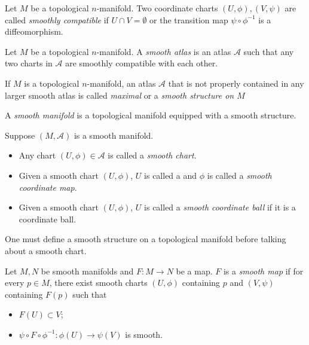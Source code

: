 \begin{defn}
  Let $M$ be a topological $n$-manifold.
  Two coordinate charts $(U, \phi), (V, \psi)$ are called \textit{smoothly compatible} if $U \cap V = \emptyset$ or the transition map $\psi \circ \phi^{-1}$ is a diffeomorphism.
\end{defn}

\begin{defn}
  Let $M$ be a topological $n$-manifold.
  A \textit{smooth atlas} is an atlas $\mathcal{A}$ such that any two charts in $\mathcal{A}$ are smoothly compatible with each other.
\end{defn}

\begin{defn}
  If $M$ is a topological $n$-manifold, an atlas $\mathcal{A}$ that is not properly contained in any larger smooth atlas is called \textit{maximal} or a \textit{smooth structure on $M$}
\end{defn}

\begin{defn}
  A \textit{smooth manifold} is a topological manifold equipped with a smooth structure.
\end{defn}

\begin{defn}
  Suppose $(M, \mathcal{A})$ is a smooth manifold.
  \begin{itemize}
    \item
      Any chart $(U, \phi) \in \mathcal{A}$ is called a \textit{smooth chart}.
    \item
      Given a smooth chart $(U, \phi)$, $U$ is called a  and $\phi$ is called a \textit{smooth coordinate map}.
    \item
      Given a smooth chart $(U, \phi)$, $U$ is called a \textit{smooth coordinate ball} if it is a coordinate ball.
  \end{itemize}
\end{defn}

\begin{rem}
  One must define a smooth structure on a topological manifold before talking about a smooth chart.
\end{rem}

\begin{defn}
  Let $M, N$ be smooth manifolds and $F: M \rightarrow N$ be a map.
  $F$ is a \textit{smooth map} if for every $p \in M$, there exist smooth charts $(U, \phi)$ containing $p$ and $(V, \psi)$ containing $F(p)$ such that
  \begin{itemize}
    \item
      $F(U) \subset V$;
    \item
      $\psi \circ F \circ \phi^{-1}: \phi(U) \rightarrow \psi(V)$ is smooth.
  \end{itemize}
\end{defn}

